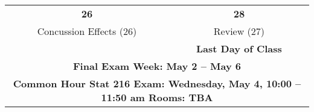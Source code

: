 \begin{center}
\begin{tabular}{|c|c|}
 \hfill\bf{26} & \hfill\bf{28} \\
  Concussion Effects \small{(26)}
  & Review    \small{(27)}
\\
  &  \small\bf{ Last Day of Class}  \\ \hline

  \multicolumn{2}{|c|}{\textbf{Final Exam Week: May 2 -- May 6 }} \\
  \multicolumn{2}{|c|}{\bf{ Common Hour Stat 216  Exam: 
      Wednesday, May 4, 10:00 -- 11:50 am Rooms: TBA}} \\
\hline

\end{tabular}
\vspace{.2in} \\
\end{center}


